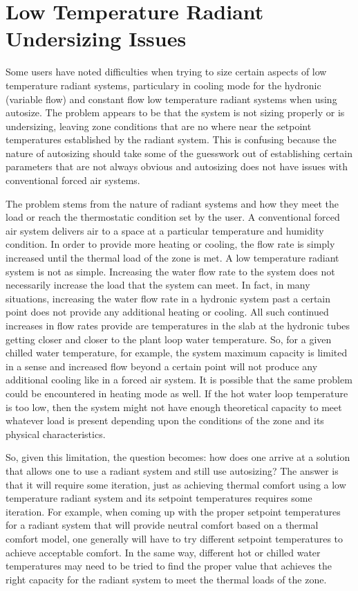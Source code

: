 \section{Low Temperature Radiant Undersizing Issues}\label{low-temperature-radiant-undersizing-issues}

Some users have noted difficulties when trying to size certain aspects of low temperature radiant systems, particulary in cooling mode for the hydronic (variable flow) and constant flow low temperature radiant systems when using autosize.  The problem appears to be that the system is not sizing properly or is undersizing, leaving zone conditions that are no where near the setpoint temperatures established by the radiant system.  This is confusing because the nature of autosizing should take some of the guesswork out of establishing certain parameters that are not always obvious and autosizing does not have issues with conventional forced air systems.

The problem stems from the nature of radiant systems and how they meet the load or reach the thermostatic condition set by the user.  A conventional forced air system delivers air to a space at a particular temperature and humidity condition.  In order to provide more heating or cooling, the flow rate is simply increased until the thermal load of the zone is met.  A low temperature radiant system is not as simple.  Increasing the water flow rate to the system does not necessarily increase the load that the system can meet.  In fact, in many situations, increasing the water flow rate in a hydronic system past a certain point does not provide any additional heating or cooling.  All such continued increases in flow rates provide are temperatures in the slab at the hydronic tubes getting closer and closer to the plant loop water temperature.  So, for a given chilled water temperature, for example, the system maximum capacity is limited in a sense and increased flow beyond a certain point will not produce any additional cooling like in a forced air system.  It is possible that the same problem could be encountered in heating mode as well.  If the hot water loop temperature is too low, then the system might not have enough theoretical capacity to meet whatever load is present depending upon the conditions of the zone and its physical characteristics.

So, given this limitation, the question becomes: how does one arrive at a solution that allows one to use a radiant system and still use autosizing?  The answer is that it will require some iteration, just as achieving thermal comfort using a low temperature radiant system and its setpoint temperatures requires some iteration.  For example, when coming up with the proper setpoint temperatures for a radiant system that will provide neutral comfort based on a thermal comfort model, one generally will have to try different setpoint temperatures to achieve acceptable comfort.  In the same way, different hot or chilled water temperatures may need to be tried to find the proper value that achieves the right capacity for the radiant system to meet the thermal loads of the zone.

